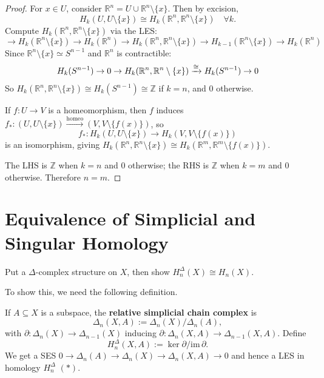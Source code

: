 \documentclass[12pt]{amsart}
\begin{document}
\begin{proof}
    For $x \in U$, consider $\mathbb{R}^n = U \cup \mathbb{R}^n \setminus \{x\}$. Then by excision,
    \[
        H_k(U, U \setminus \{x\}) \cong H_k(\mathbb{R}^n, \mathbb{R}^n \setminus \{x\}) \quad \forall k.
    \]
    Compute $H_k(\mathbb{R}^n, \mathbb{R}^n \setminus \{x\})$ via the LES:
    \[
        \to H_k(\mathbb{R}^n \setminus \{x\}) \to H_k(\mathbb{R}^n) \to H_k(\mathbb{R}^n, \mathbb{R}^n \setminus \{x\}) \to H_{k-1}(\mathbb{R}^n \setminus \{x\}) \to H_k(\mathbb{R}^n)
    \]
    Since $\mathbb{R}^n \setminus \{x\} \simeq S^{n-1}$ and $\mathbb{R}^n$ is contractible:
    \[
        H_k(S^{n-1}) \to 0 \to H_k(\mathbb{R}^n, \mathbb{R}^n \setminus \{x\}) \xrightarrow{\cong} H_k(S^{n-1}) \to 0
    \]
    So $H_k(\mathbb{R}^n, \mathbb{R}^n \setminus \{x\}) \cong H_k(S^{n-1}) \cong \mathbb{Z}$ if $k = n$, and $0$ otherwise.

    If $f: U \to V$ is a homeomorphism, then $f$ induces $f_*: (U, U\setminus\{x\}) \xrightarrow{\mathrm{homeo}} (V, V \setminus \{f(x)\})$, so
    \[
        f_*: H_k(U, U\setminus\{x\}) \to H_k(V, V\setminus\{f(x)\})
    \]
    is an isomorphism, giving $H_k(\mathbb{R}^n, \mathbb{R}^n\setminus\{x\}) \cong H_k(\mathbb{R}^m, \mathbb{R}^m\setminus\{f(x)\})$.

    The LHS is $\mathbb{Z}$ when $k=n$ and $0$ otherwise; the RHS is $\mathbb{Z}$ when $k=m$ and $0$ otherwise. Therefore $n=m$.
\end{proof}

\newpage

\section{Equivalence of Simplicial and Singular Homology}

Put a $\Delta$-complex structure on $X$, then show $H_n^\Delta(X) \cong H_n(X)$.

To show this, we need the following definition.

\begin{definition}
    If $A \subseteq X$ is a subspace, the \textbf{relative simplicial chain complex} is
    \[
        \Delta_n(X,A) := \Delta_n(X)/\Delta_n(A),
    \]
    with $\partial: \Delta_n(X) \to \Delta_{n-1}(X)$ inducing $\partial: \Delta_n(X,A) \to \Delta_{n-1}(X,A)$. Define
    \[
        H_n^\Delta(X,A) := \ker\partial / \mathrm{im}\,\partial.
    \]
    We get a SES $0 \to \Delta_n(A) \to \Delta_n(X) \to \Delta_n(X,A) \to 0$ and hence a LES in homology $H_n^\Delta$ \quad $(*)$.
\end{definition}
\end{document}
